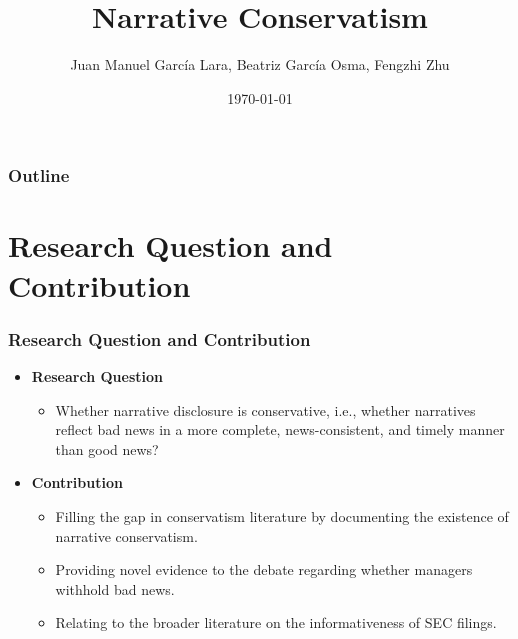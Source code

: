 \documentclass{beamer}
\title[Narrative Conservatism]{Narrative Conservatism} %
\author[]{Juan Manuel Garc\'ia Lara, Beatriz Garc\'ia Osma, Fengzhi Zhu} %
\institute[] %
{Universidad Carlos III de Madrid \\ %

	\medskip
	fzhu@emp.uc3m.es} %
\date{\today} %
\begin{document}
	
\begin{frame}
\titlepage %
\end{frame}

\begin{frame}
\frametitle{Outline}
\tableofcontents
\end{frame}

\section{Research Question and Contribution}

\begin{frame}
\frametitle{Research Question and Contribution}
\begin{itemize}
\item \textbf{Research Question}

\begin{itemize}
\item Whether narrative disclosure is conservative, i.e., whether narratives reflect bad news in a more complete, news-consistent, and timely manner than good news?
\end{itemize}

\item \textbf{Contribution}

\begin{itemize}
	\item Filling the gap in conservatism literature by documenting the existence of narrative conservatism.
	\item Providing novel evidence to the debate regarding whether managers withhold bad news. 
	\item Relating to the broader literature on the informativeness of SEC filings.
\end{itemize}
\end{itemize}
\end{frame}
\end{document}
